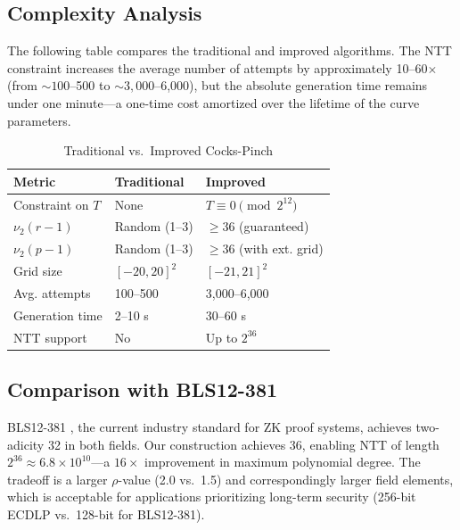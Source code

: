 \subsection{Complexity Analysis}\label{complexity-analysis}

The following table compares the traditional and improved algorithms.
The NTT constraint increases the average number of attempts by
approximately 10--60\(\times\) (from \({\sim}100\)--500 to
\({\sim}3{,}000\)--6,000), but the absolute generation time remains
under one minute---a one-time cost amortized over the lifetime of the
curve parameters.

\begin{table}[t]
\centering
\caption{Traditional vs.~Improved Cocks-Pinch}
\begin{tabular}{lll}
\toprule
Metric & Traditional & Improved \\
\midrule
Constraint on \(T\) & None & \(T \equiv 0 \pmod{2^{12}}\) \\
\(\nu_2(r-1)\) & Random (1--3) & \(\geq 36\) (guaranteed) \\
\(\nu_2(p-1)\) & Random (1--3) & \(\geq 36\) (with ext. grid) \\
Grid size & \([-20,20]^2\) & \([-21,21]^2\) \\
Avg. attempts & 100--500 & 3,000--6,000 \\
Generation time & 2--10 s & 30--60 s \\
NTT support & No & Up to \(2^{36}\) \\
\bottomrule
\end{tabular}
\end{table}

\subsection{Comparison with BLS12-381}\label{comparison-with-bls12-381}

BLS12-381 \cite{BLS12_381}, the current industry standard for ZK proof
systems, achieves two-adicity 32 in both fields. Our construction
achieves 36, enabling NTT of length
\(2^{36} \approx 6.8 \times 10^{10}\)---a \(16\times\) improvement in
maximum polynomial degree. The tradeoff is a larger \(\rho\)-value (2.0
vs.~1.5) and correspondingly larger field elements, which is acceptable
for applications prioritizing long-term security (256-bit ECDLP
vs.~128-bit for BLS12-381).
